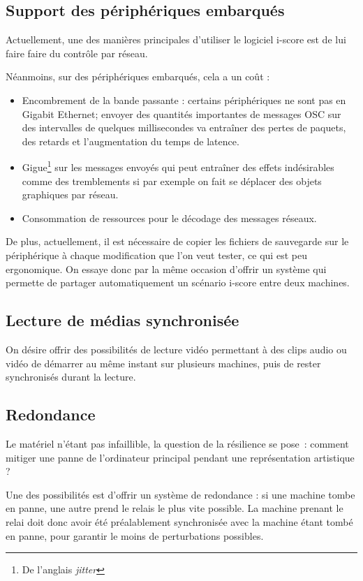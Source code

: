 \documentclass{article}
\begin{document}
\subsection{Support des périphériques embarqués}
Actuellement, une des manières principales d'utiliser le logiciel i-score est de lui faire faire du contrôle par réseau. 

Néanmoins, sur des périphériques embarqués, cela a un coût : 
\begin{itemize}
    \item Encombrement de la bande passante : certains périphériques ne sont pas en Gigabit Ethernet; envoyer des quantités importantes de messages OSC sur des intervalles de quelques millisecondes va entraîner des pertes de paquets, des retards et l'augmentation du temps de latence.
    \item Gigue\footnote{De l'anglais \textit{jitter}} sur les messages envoyés qui peut entraîner des effets indésirables comme des tremblements si par exemple on fait se déplacer des objets graphiques par réseau.
    \item Consommation de ressources pour le décodage des messages réseaux.
\end{itemize}

De plus, actuellement, il est nécessaire de copier les fichiers de sauvegarde sur le périphérique à chaque modification que l'on veut tester, ce qui est peu ergonomique. 
On essaye donc par la même occasion d'offrir un système qui permette de partager automatiquement un scénario i-score entre deux machines.

\subsection{Lecture de médias synchronisée}
On désire offrir des possibilités de lecture vidéo permettant à 
des clips audio ou vidéo de démarrer au même instant sur plusieurs machines, 
puis de rester synchronisés durant la lecture.

\subsection{Redondance}
Le matériel n'étant pas infaillible, la question de la résilience se pose~: comment mitiger une panne de l'ordinateur principal pendant une représentation artistique ?

Une des possibilités est d'offrir un système de redondance : si une machine tombe en panne, une autre prend le relais le plus vite possible.
La machine prenant le relai doit donc avoir été préalablement synchronisée avec la machine étant tombé en panne, pour garantir le moins de perturbations possibles.
 
\end{document}
